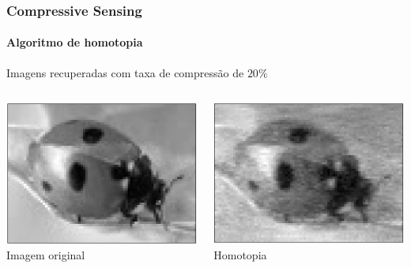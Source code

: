 \documentclass[11pt]{beamer}
\begin{document}
\begin{frame}
\frametitle{Compressive Sensing}
\framesubtitle{Algoritmo de homotopia}
\begin{center}
Imagens recuperadas com taxa de compressão de $20\%$\\
\end{center}

\begin{columns}[t]
\centering
\includegraphics[scale=.25]{imagens/joaninha.png}\\
Imagem original

\centering
\includegraphics[scale=.25]{imagens/joaninhaHomotopy_20porcento.png}\\
Homotopia


\end{columns}
\end{frame}
\end{document}
